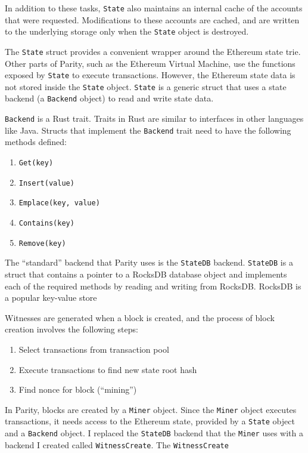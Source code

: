 \documentclass[12pt]{article}
\begin{document}
In addition to these tasks, \texttt{State} also maintains an internal cache of the accounts that were requested. Modifications to these accounts are cached, and are written to the underlying storage only when the \texttt{State} object is destroyed.

The \texttt{State} struct provides a convenient wrapper around the Ethereum state trie. Other parts of Parity, such as the Ethereum Virtual Machine, use the functions exposed by \texttt{State} to execute transactions. However, the Ethereum state data is not stored inside the \texttt{State} object. \texttt{State} is a generic struct that uses a state backend (a \texttt{Backend} object) to read and write state data.

\texttt{Backend} is a Rust trait. Traits in Rust are similar to interfaces in other languages like Java. Structs that implement the \texttt{Backend} trait need to have the following methods defined:

\begin{enumerate}
  \item \texttt{Get(key)}
  \item \texttt{Insert(value)}
  \item \texttt{Emplace(key, value)}
  \item \texttt{Contains(key)}
  \item \texttt{Remove(key)}
\end{enumerate}

The ``standard'' backend that Parity uses is the \texttt{StateDB} backend. \texttt{StateDB} is a struct that contains a pointer to a RocksDB database object and implements each of the required methods by reading and writing from RocksDB. RocksDB is a popular key-value store


Witnesses are generated when a block is created, and the process of block creation involves the following steps:
\begin{enumerate}
  \item Select transactions from transaction pool
  \item Execute transactions to find new state root hash
  \item Find nonce for block (``mining'')
\end{enumerate}
In Parity, blocks are created by a \texttt{Miner} object. Since the \texttt{Miner} object executes transactions, it needs access to the Ethereum state, provided by a \texttt{State} object and a \texttt{Backend} object. I replaced the \texttt{StateDB} backend that the \texttt{Miner} uses with a backend I created called \texttt{WitnessCreate}. The \texttt{WitnessCreate}
\end{document}
